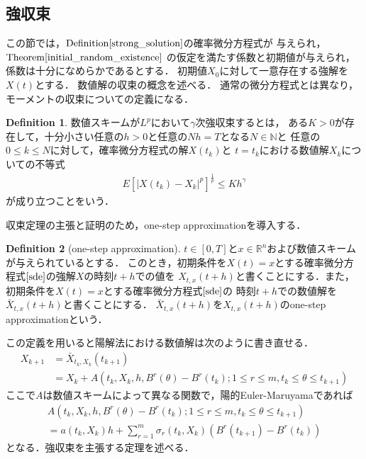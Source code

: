\documentclass[dvipdfmx,autodetect-engine]{jsarticle}
\theoremstyle{remark}
\theoremstyle{definition}
\newtheorem{definition}{Definition}[section]
\newcommand{\R}{\mathbb{R}}
\newcommand{\N}{\mathbb{N}}
\newcommand{\abs}[1]{\left\lvert#1\right\rvert}
\begin{document}
\subsection{強収束}
この節では，$\mathrm{Definition}\ref{strong_solution}$の確率微分方程式が
与えられ，$\mathrm{Theorem}\ref{initial_random_existence}$
の仮定を満たす係数と初期値が与えられ，係数は十分になめらかであるとする．
初期値$X_{0}$に対して一意存在する強解を$X(t)$とする．
数値解の収束の概念を述べる．
通常の微分方程式とは異なり，モーメントの収束についての定義になる．


\begin{definition}
    数値スキームが$L^p$において$\gamma$次強収束するとは，
    ある$K>0$が存在して，十分小さい任意の$h>0$と任意の$Nh=T$となる$N \in \N$と
    任意の$0\leq k\leq N$に対して，確率微分方程式の解$X(t_{k})$と
    $t=t_{k}$における数値解$X_{k}$についての不等式
    \begin{align}
        E[\abs{X(t_{k}) - X_{k}}^{p}]^{\frac{1}{p}} \leq Kh^{\gamma}
    \end{align}
    が成り立つことをいう．
\end{definition}


収束定理の主張と証明のため，one-step approximationを導入する．
\begin{definition}[one-step approximation]
    $t\in [0,T]$と$x \in \R^{n}$および数値スキームが与えられているとする．
    このとき，初期条件を$X(t)=x$とする確率微分方程式$\eqref{sde}$の強解$X$の時刻$t+h$での値を
    $X_{t,x}(t+h)$と書くことにする．また，初期条件を$X(t)=x$とする確率微分方程式$\eqref{sde}$の
    時刻$t+h$での数値解を$\bar{X}_{t,x}(t+h)$と書くことにする．
    $\bar{X}_{t,x}(t+h)$を$X_{t,x}(t+h)$のone-step approximationという．
\end{definition}


この定義を用いると陽解法における数値解は次のように書き直せる．
\begin{align}
    X_{k+1} &= \bar{X}_{t_{k},X_{k}}(t_{k+1}) \\
            &= X_{k} + A\left(t_{k},X_{k},h,B^{r}(\theta)-B^{r}(t_{k})
            ; 1\leq r\leq m ,t_{k} \leq \theta \leq t_{k+1} \right)
\end{align}
ここで$A$は数値スキームによって異なる関数で，陽的Euler-Maruyamaであれば
\begin{align}
    A\left(t_{k},X_{k},h,B^{r}(\theta)-B^{r}(t_{k})
    ; 1\leq r\leq m ,t_{k} \leq \theta \leq t_{k+1} \right) \\
    = a(t_{k},X_{k})h + \sum_{r=1}^{m}\sigma_{r}(t_{k},X_{k})(B^{r}(t_{k+1})-B^{r}(t_{k}))
\end{align}
となる．強収束を主張する定理を述べる．
\end{document}

